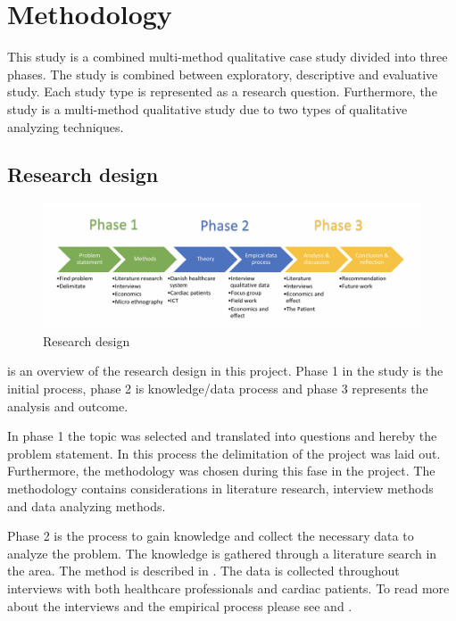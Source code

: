 \chapter{Methodology}

This study is a combined multi-method qualitative case study divided into three phases.
The study is combined between exploratory, descriptive and evaluative study. Each study type is represented as a research question. Furthermore, the study is a multi-method qualitative study due to two types of qualitative analyzing techniques. 
\section{Research design}

\begin{figure}[H]
\centering
\includegraphics[width=1.10\textwidth]{Figure/researchdesign.png}
\caption{Research design}
\label{fig:Researchdesign}
\end{figure} 

 is an overview of the research design in this project.
 Phase 1 in the study is the initial process, phase 2 is knowledge/data process and phase 3 represents the analysis and outcome.

In phase 1 the topic was selected and translated into questions and hereby the problem statement. In this process the delimitation of the project was laid out. Furthermore, the methodology was chosen during this fase in the project. The methodology contains considerations in literature research, interview methods and data analyzing methods. 

Phase 2 is the process to gain knowledge and collect the necessary data to analyze the problem. The knowledge is gathered through a literature search in the area. The method is described in . The data is collected throughout interviews with both healthcare professionals and cardiac patients. To read more about the interviews and the empirical process please see  and .

